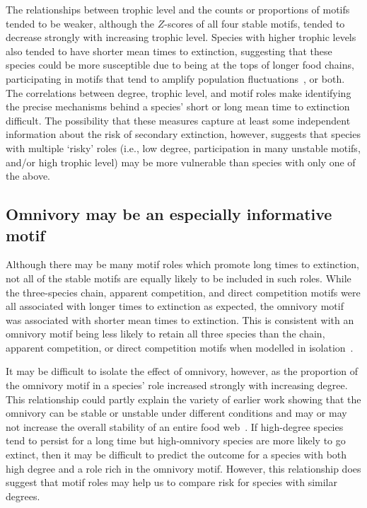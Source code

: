 \documentclass[12pt]{article}
\begin{document}
\begin{spacing}{2.0}
		
        The relationships between trophic level and the counts or proportions of motifs tended to be weaker, although the $Z$-scores of all four stable motifs, tended to decrease strongly with increasing trophic level.
        Species with higher trophic levels also tended to have shorter mean times to extinction, suggesting that these species could be more susceptible due to being at the tops of longer food chains, participating in motifs that tend to amplify population fluctuations~\citep{Borrelli2015a}, or both.
        The correlations between degree, trophic level, and motif roles make identifying the precise mechanisms behind a species' short or long mean time to extinction difficult.
        The possibility that these measures capture at least some independent information about the risk of secondary extinction, however, suggests that species with multiple `risky' roles (i.e., low degree, participation in many unstable motifs, and/or high trophic level) may be more vulnerable than species with only one of the above.

        
    \subsection*{Omnivory may be an especially informative motif}
	    
        Although there may be many motif roles which promote long times to extinction, not all of the stable motifs are equally likely to be included in such roles.
        While the three-species chain, apparent competition, and direct competition motifs were all associated with longer times to extinction as expected, the omnivory motif was associated with shorter mean times to extinction. 
        This is consistent with an omnivory motif being less likely to retain all three species than the chain, apparent competition, or direct competition motifs when modelled in isolation~\citep{Borrelli2015a}. 


        It may be difficult to isolate the effect of omnivory, however, as the proportion of the omnivory motif in a species' role increased strongly with increasing degree. 
        This relationship could partly explain the variety of earlier work showing that the omnivory can be stable or unstable under different conditions and may or may not increase the overall stability of an entire food web~\citep{McCann1997,Emmerson2004,Borrelli2015a,Monteiro2016}.
        If high-degree species tend to persist for a long time but high-omnivory species are more likely to go extinct, then it may be difficult to predict the outcome for a species with both high degree and a role rich in the omnivory motif.
        However, this relationship does suggest that motif roles may help us to compare risk for species with similar degrees.



\end{spacing}
\end{document}
